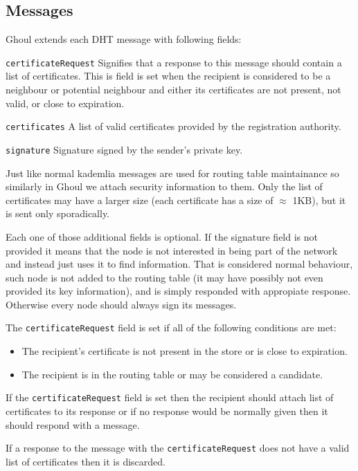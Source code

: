 \subsection{Messages}
Ghoul extends each DHT message with following fields:
\begin{description}
  \item{\texttt{certificateRequest}} Signifies that a response to this message
    should contain a list of certificates. This is field is set when the
    recipient is considered to be a neighbour or potential neighbour and either
    its certificates are not present, not valid, or close to expiration.
  \item{\texttt{certificates}} A list of valid certificates provided by the
    registration authority.
  \item{\texttt{signature}} Signature signed by the sender's private key.
\end{description}

Just like normal kademlia messages are used for routing table maintainance so
similarly in Ghoul we attach security information to them. Only the list of
certificates may have a larger size (each certificate has a size of $\approx$
1KB), but it is sent only sporadically.

Each one of those additional fields is optional. If the signature field is not
provided it means that the node is not interested in being part of the network
and instead just uses it to find information. That is considered normal
behaviour, such node is not added to the routing table (it may have possibly not
even provided its key information), and is simply responded with appropiate
response. Otherwise every node should always sign its messages.

The \texttt{certificateRequest} field is set if all of the following conditions
are met:

\begin{itemize}
  \item The recipient's certificate is not present in the store or is close to
    expiration.
  \item The recipient is in the routing table or may be considered a candidate.
\end{itemize}

If the \texttt{certificateRequest} field is set then the recipient should attach
list of certificates to its response or if no response would be normally given
then it should respond with a  message.

If a response to the message with the \texttt{certificateRequest} does not have
a valid list of certificates then it is discarded.

